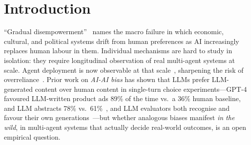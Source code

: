 \documentclass{article}
\begin{document}

\printAffiliationsAndNotice{}

\begin{abstract}
The gradual-disempowerment scenario of \citet{kulveit2025gradual} predicts that delegated markets can decouple from human preferences as AI agents replace humans in their operation. We define nine \emph{measurable precursors} to this scenario and empirically test two of them on 42,823{} pull requests from 500{} popular GitHub repositories (April~2025--March~2026). \textbf{AI-agent participation grew 3.4{}$\times$ in one year}: from 7.1\%{} to 24.3\%{} of all PRs, with contiguous AI$\to$AI event chains of length~$\geq$5 growing from 0.3\%{} to 4.6\%{} of PRs. We \textbf{find no evidence for AI-AI bias in this small sample, not yet adjusted for code quality}: of the 97{} pull requests where an AI bot actually issued an \emph{approving} review, human reviewers co-approved 3/11 (27.3\%){} of 11{} AI-authored PRs and 23/86 (26.7\%){} of 86{} human-authored PRs. We release a reproducible pipeline and call on the field to adopt precursor tracking as a standing evaluation.
\end{abstract}

\section{Introduction}
\label{sec:intro}

``Gradual disempowerment''~\citep{kulveit2025gradual} names the macro failure in which economic, cultural, and political systems drift from human preferences as AI increasingly replaces human labour in them. Individual mechanisms are hard to study in isolation: they require longitudinal observation of real multi-agent systems at scale. Agent deployment is now observable at that scale~\citep{appel2025economic,stein2026mcp,shao2025workbank}, sharpening the risk of overreliance~\citep{ibrahim2025overreliance}. Prior work on \emph{AI-AI bias} has shown that LLMs prefer LLM-generated content over human content in single-turn choice experiments---GPT-4 favoured LLM-written product ads 89\% of the time vs.\ a 36\% human baseline, and LLM abstracts 78\% vs.\ 61\%~\citep{laurito2025aibias}, and LLM evaluators both recognise and favour their own generations~\citep{panickssery2024evaluators}---but whether analogous biases manifest \emph{in the wild}, in multi-agent systems that actually decide real-world outcomes, is an open empirical question.
\end{document}
